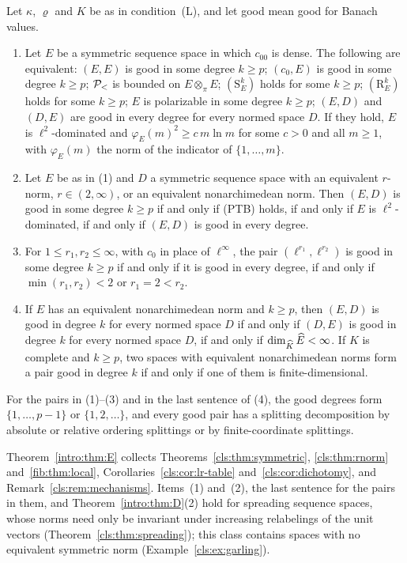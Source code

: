 \begin{introtheorem}\label{intro:thm:E}
Let $\kappa$, $\varrho$ and $K$ be as in condition~\textup{(L)}, and let good mean good for Banach values.
\begin{enumerate}
\item Let $E$ be a symmetric sequence space in which $c_{00}$ is dense. The following are equivalent: $(E,E)$ is good
in some degree $k\ge p$; $(c_0,E)$ is good in some degree $k\ge p$; $\mathcal P_<$ is bounded on $E\otimes_\pi E$;
$(\mathrm S^k_E)$ holds for some $k\ge p$; $(\mathrm R^k_E)$ holds for some $k\ge p$; $E$ is polarizable in some degree $k\ge p$; $(E,D)$ and $(D,E)$ are good in every
degree for every normed space $D$. If they hold, $E$ is $\ell^2$-dominated and $\varphi_E(m)^2\ge c\,m\ln m$ for some
$c>0$ and all $m\ge1$, with $\varphi_E(m)$ the norm of the indicator of $\{1,\dots,m\}$.
\item Let $E$ be as in \textup{(1)} and $D$ a symmetric sequence space with an equivalent $r$-norm, $r\in(2,\infty)$,
or an equivalent nonarchimedean norm. Then $(E,D)$ is good in some degree $k\ge p$ if and only if \textup{(PTB)}
holds, if and only if $E$ is $\ell^2$-dominated, if and only if $(E,D)$ is good in every degree.
\item For $1\le r_1,r_2\le\infty$, with $c_0$ in place of $\ell^\infty$, the pair $(\ell^{r_1},\ell^{r_2})$ is good in
some degree $k\ge p$ if and only if it is good in every degree, if and only if $\min(r_1,r_2)<2$ or $r_1=2<r_2$.
\item If $E$ has an equivalent nonarchimedean norm and $k\ge p$, then $(E,D)$ is good in degree $k$ for every normed
space $D$ if and only if $(D,E)$ is good in degree $k$ for every normed space $D$, if and only if $\dim_{\widehat K}\widehat E<\infty$. If $K$ is complete and $k\ge p$, two
spaces with equivalent nonarchimedean norms form a pair good in degree $k$ if and only if one of them is
finite-dimensional.
\end{enumerate}
For the pairs in \textup{(1)}--\textup{(3)} and in the last sentence of \textup{(4)}, the good degrees form
$\{1,\dots,p-1\}$ or $\{1,2,\dots\}$, and every good pair has a splitting decomposition by absolute or relative
ordering splittings or by finite-coordinate splittings.
\end{introtheorem}

Theorem~\ref{intro:thm:E} collects Theorems~\ref{cls:thm:symmetric}, \ref{cls:thm:rnorm} and~\ref{fib:thm:local},
Corollaries~\ref{cls:cor:lr-table} and~\ref{cls:cor:dichotomy}, and Remark~\ref{cls:rem:mechanisms}. Items~(1)
and~(2), the last sentence for the pairs in them, and Theorem~\ref{intro:thm:D}(2) hold for spreading sequence spaces,
whose norms need only be invariant under increasing relabelings of the unit vectors (Theorem~\ref{cls:thm:spreading});
this class contains spaces with no equivalent symmetric norm (Example~\ref{cls:ex:garling}).

